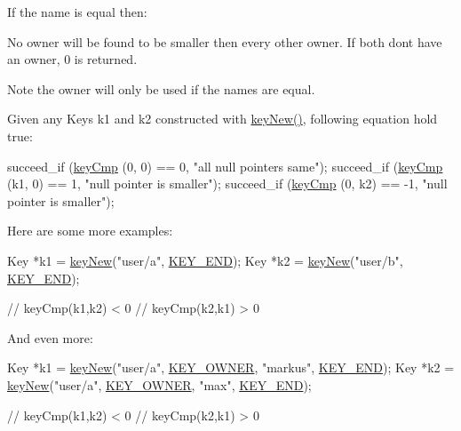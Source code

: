 If the name is equal then\+:


\begin{DoxyItemize}
\item No owner will be found to be smaller then every other owner. If both don\textquotesingle{}t have an owner, 0 is returned.
\end{DoxyItemize}

\begin{DoxyNote}{Note}
the owner will only be used if the names are equal.
\end{DoxyNote}
Given any Keys k1 and k2 constructed with \hyperlink{group__key_gad23c65b44bf48d773759e1f9a4d43b89}{key\+New()}, following equation hold true\+:


\begin{DoxyCodeInclude}
        succeed\_if (\hyperlink{group__keytest_gaf6e66e12fe04d535a5d1c8218ced803e}{keyCmp} (0, 0) == 0, \textcolor{stringliteral}{"all null pointers same"});
        succeed\_if (\hyperlink{group__keytest_gaf6e66e12fe04d535a5d1c8218ced803e}{keyCmp} (k1, 0) == 1, \textcolor{stringliteral}{"null pointer is smaller"});
        succeed\_if (\hyperlink{group__keytest_gaf6e66e12fe04d535a5d1c8218ced803e}{keyCmp} (0, k2) == -1, \textcolor{stringliteral}{"null pointer is smaller"});
\end{DoxyCodeInclude}
 Here are some more examples\+: 
\begin{DoxyCode}
Key *k1 = \hyperlink{group__key_gad23c65b44bf48d773759e1f9a4d43b89}{keyNew}(\textcolor{stringliteral}{"user/a"}, \hyperlink{group__key_gga9b703ca49f48b482def322b77d3e6bc8aa8adb6fcb92dec58fb19410eacfdd403}{KEY\_END});
Key *k2 = \hyperlink{group__key_gad23c65b44bf48d773759e1f9a4d43b89}{keyNew}(\textcolor{stringliteral}{"user/b"}, \hyperlink{group__key_gga9b703ca49f48b482def322b77d3e6bc8aa8adb6fcb92dec58fb19410eacfdd403}{KEY\_END});

\textcolor{comment}{// keyCmp(k1,k2) < 0}
\textcolor{comment}{// keyCmp(k2,k1) > 0}
\end{DoxyCode}


And even more\+: 
\begin{DoxyCode}
Key *k1 = \hyperlink{group__key_gad23c65b44bf48d773759e1f9a4d43b89}{keyNew}(\textcolor{stringliteral}{"user/a"}, \hyperlink{group__key_gga9b703ca49f48b482def322b77d3e6bc8a77ca60362fa8daca8d5347db4385068b}{KEY\_OWNER}, \textcolor{stringliteral}{"markus"}, \hyperlink{group__key_gga9b703ca49f48b482def322b77d3e6bc8aa8adb6fcb92dec58fb19410eacfdd403}{KEY\_END});
Key *k2 = \hyperlink{group__key_gad23c65b44bf48d773759e1f9a4d43b89}{keyNew}(\textcolor{stringliteral}{"user/a"}, \hyperlink{group__key_gga9b703ca49f48b482def322b77d3e6bc8a77ca60362fa8daca8d5347db4385068b}{KEY\_OWNER}, \textcolor{stringliteral}{"max"}, \hyperlink{group__key_gga9b703ca49f48b482def322b77d3e6bc8aa8adb6fcb92dec58fb19410eacfdd403}{KEY\_END});

\textcolor{comment}{// keyCmp(k1,k2) < 0}
\textcolor{comment}{// keyCmp(k2,k1) > 0}
\end{DoxyCode}


